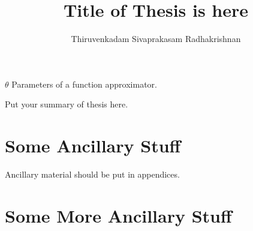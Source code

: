 \documentclass{uicthesi}
\begin{document}

\title{Title of Thesis is here}
\author{Thiruvenkadam Sivaprakasam Radhakrishnan}
\pdegrees{}
 \maketitle


\tableofcontents \listoftables \listoffigures
\listofabbreviations \begin{list} {} {\setlength {\labelwidth}{1in} \setlength{\leftmargin}{1.5in}
		\setlength{\labelsep}{.5in} \setlength{\rightmargin}{\leftmargin}} \item[$\theta$\hfill] Parameters
		of a function approximator.
\end{list}

\summary
Put your summary of thesis here.












\appendices
\newpage
\appendix

\chapter{Some Ancillary Stuff}

Ancillary material should be put in appendices.

\chapter{Some More Ancillary Stuff}


\cite{Farine20162243}

\bibformb

\newpage
\end{document}
